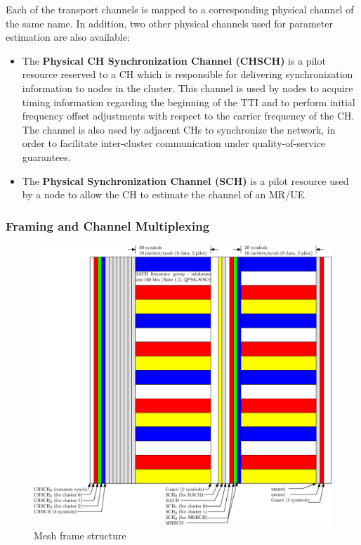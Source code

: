 \documentclass[a4paper,twocolumn,journal]{IEEEtran}
\begin{document}
Each of the transport channels is mapped to a corresponding physical channel of the same name. In addition, two other physical channels used for parameter estimation are also available: 
\begin{itemize}
\item The {\bf Physical CH Synchronization Channel (CHSCH)} is a pilot resource reserved to a CH which is responsible for delivering synchronization information to nodes in the cluster. This channel is used by nodes to acquire timing information regarding the beginning of the TTI and to perform initial frequency offset adjustments with respect to the carrier frequency of the CH. The channel is also used by adjacent CHs to synchronize the network, in order to facilitate inter-cluster communication under quality-of-service guarantees. 
\item The {\bf Physical Synchronization Channel (SCH)} is a pilot resource used by a node to allow the CH to estimate the channel of an MR/UE.
\end{itemize}

\subsubsection{Framing and Channel Multiplexing}

\begin{figure}
 \includegraphics[width=\columnwidth]{figures/mesh_frame}
\caption{Mesh frame structure}
\label{fig:frame_structure}
\end{figure}
\end{document}
